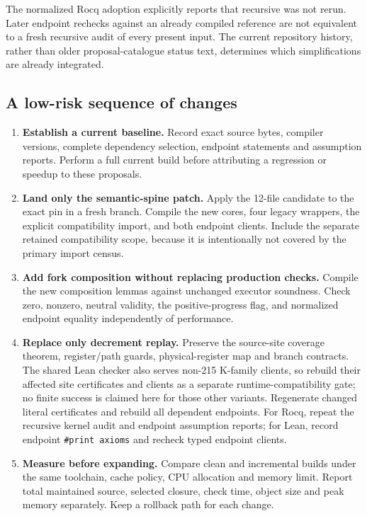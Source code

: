 The normalized Rocq adoption explicitly reports that recursive  was not rerun. Later endpoint rechecks against an already compiled reference are not equivalent to a fresh recursive audit of every present input. The current repository history, rather than older proposal-catalogue status text, determines which simplifications are already integrated.

\subsection{A low-risk sequence of changes}
\begin{enumerate}
\item \textbf{Establish a current baseline.} Record exact source bytes, compiler versions, complete dependency selection, endpoint statements and assumption reports. Perform a full current build before attributing a regression or speedup to these proposals.
\item \textbf{Land only the semantic-spine patch.} Apply the 12-file candidate to the exact pin in a fresh branch. Compile the new cores, four legacy wrappers, the explicit  compatibility import, and both endpoint clients. Include the separate retained compatibility scope, because it is intentionally not covered by the primary import census.
\item \textbf{Add fork composition without replacing production checks.} Compile the new composition lemmas against unchanged executor soundness. Check zero, nonzero, neutral validity, the positive-progress flag, and normalized endpoint equality independently of performance.
\item \textbf{Replace only decrement replay.} Preserve the source-site coverage theorem, register/path guards, physical-register map and branch contracts. The shared Lean  checker also serves non-215 K-family clients, so rebuild their affected site certificates and clients as a separate runtime-compatibility gate; no finite success is claimed here for those other variants. Regenerate changed literal certificates and rebuild all dependent endpoints. For Rocq, repeat the recursive kernel audit and endpoint assumption reports; for Lean, record endpoint \texttt{\#print axioms} and recheck typed endpoint clients.
\item \textbf{Measure before expanding.} Compare clean and incremental builds under the same toolchain, cache policy, CPU allocation and memory limit. Report total maintained source, selected closure, check time, object size and peak memory separately. Keep a rollback path for each change.
\end{enumerate}

